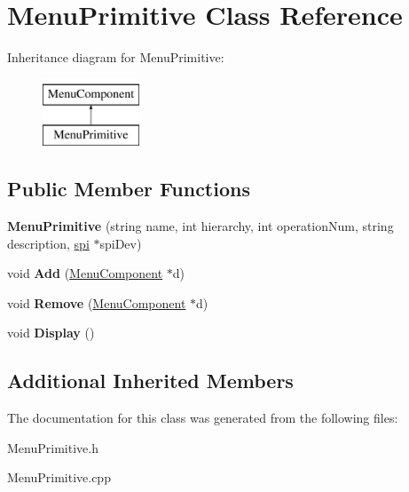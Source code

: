 \hypertarget{classMenuPrimitive}{\section{Menu\-Primitive Class Reference}
\label{classMenuPrimitive}
}
Inheritance diagram for Menu\-Primitive\-:\begin{figure}[H]
\begin{center}
\leavevmode
\includegraphics[height=2.000000cm]{classMenuPrimitive}
\end{center}
\end{figure}
\subsection*{Public Member Functions}
\begin{DoxyCompactItemize}
\item 
\hypertarget{classMenuPrimitive_a1676c1cd62bcee6034a7d393e422e4bd}{{\bfseries Menu\-Primitive} (string name, int hierarchy, int operation\-Num, string description, \hyperlink{classspi}{spi} $\ast$spi\-Dev)}\label{classMenuPrimitive_a1676c1cd62bcee6034a7d393e422e4bd}

\item 
\hypertarget{classMenuPrimitive_a452cdf28b74ebc7a2248ea044b457140}{void {\bfseries Add} (\hyperlink{classMenuComponent}{Menu\-Component} $\ast$d)}\label{classMenuPrimitive_a452cdf28b74ebc7a2248ea044b457140}

\item 
\hypertarget{classMenuPrimitive_a4c2032990cfc38456d65c7ad4213406d}{void {\bfseries Remove} (\hyperlink{classMenuComponent}{Menu\-Component} $\ast$d)}\label{classMenuPrimitive_a4c2032990cfc38456d65c7ad4213406d}

\item 
\hypertarget{classMenuPrimitive_acf5b9c7eff88942899b53459a2b45837}{void {\bfseries Display} ()}\label{classMenuPrimitive_acf5b9c7eff88942899b53459a2b45837}

\end{DoxyCompactItemize}
\subsection*{Additional Inherited Members}


The documentation for this class was generated from the following files\-:\begin{DoxyCompactItemize}
\item 
Menu\-Primitive.\-h\item 
Menu\-Primitive.\-cpp\end{DoxyCompactItemize}
